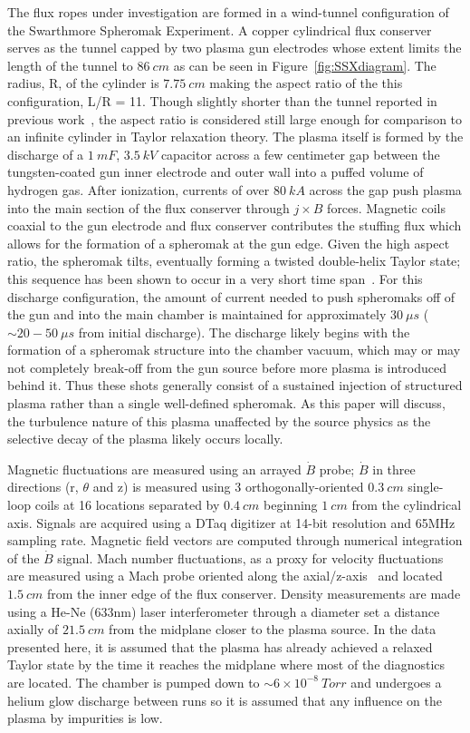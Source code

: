 \documentclass[12pt]{iopart}
\begin{document}
The flux ropes under investigation are formed in a wind-tunnel configuration of the Swarthmore Spheromak Experiment. A copper cylindrical flux conserver serves as the tunnel capped by two plasma gun electrodes whose extent limits the length of the tunnel to $86~cm$ as can be seen in Figure~\ref{fig:SSXdiagram}. The radius, R,  of the cylinder is $7.75~cm$ making the aspect ratio of the this configuration, L/R = 11. Though slightly shorter than the tunnel reported in previous work~\cite{Gray13}, the aspect ratio is considered still large enough for comparison to an infinite cylinder in Taylor relaxation theory. The plasma itself is formed by the discharge of a $1~mF$, $3.5~kV$ capacitor across a few centimeter gap between the tungsten-coated gun inner electrode and outer wall into a puffed volume of hydrogen gas. After ionization, currents of over $80~kA$ across the gap push plasma into the main section of the flux conserver through $j \times B$ forces. Magnetic coils coaxial to the gun electrode and flux conserver contributes the stuffing flux which allows for the formation of a spheromak at the gun edge. Given the high aspect ratio, the spheromak tilts, eventually forming a twisted double-helix Taylor state; this sequence has been shown to occur in a very short time span~\cite{Gray13}. For this discharge configuration, the amount of current needed to push spheromaks off of the gun and into the main chamber is maintained for approximately $30~\mu s$ ($\sim 20-50~\mu s$ from initial discharge). The discharge likely begins with the formation of a spheromak structure into the chamber vacuum, which may or may not completely break-off from the gun source before more plasma is introduced behind it. Thus these shots generally consist of a sustained injection of structured plasma rather than a single well-defined spheromak. As this paper will discuss, the turbulence nature of this plasma unaffected by the source physics as the selective decay of the plasma likely occurs locally.

Magnetic fluctuations are measured using an arrayed $\dot{B}$ probe; $\dot{B}$ in three directions (r, $\theta$ and z) is measured using 3 orthogonally-oriented $0.3~cm$ single-loop coils at 16 locations separated by $0.4~cm$ beginning $1~cm$ from the cylindrical axis. Signals are acquired using a DTaq digitizer at 14-bit resolution and 65MHz sampling rate. Magnetic field vectors are computed through numerical integration of the $\dot{B}$ signal. Mach number fluctuations, as a proxy for velocity fluctuations are measured using a Mach probe oriented along the axial/z-axis~\cite{Zhang11} and located $1.5~cm$ from the inner edge of the flux conserver. Density measurements are made using a He-Ne (633nm) laser interferometer through a diameter set a distance axially of $21.5~cm$ from the midplane closer to the plasma source. In the data presented here, it is assumed that the plasma has already achieved a relaxed Taylor state by the time it reaches the midplane where most of the diagnostics are located. The chamber is pumped down to $\sim 6 \times 10^{-8}~Torr$ and undergoes a helium glow discharge between runs so it is assumed that any influence on the plasma by impurities is low.
\end{document}
